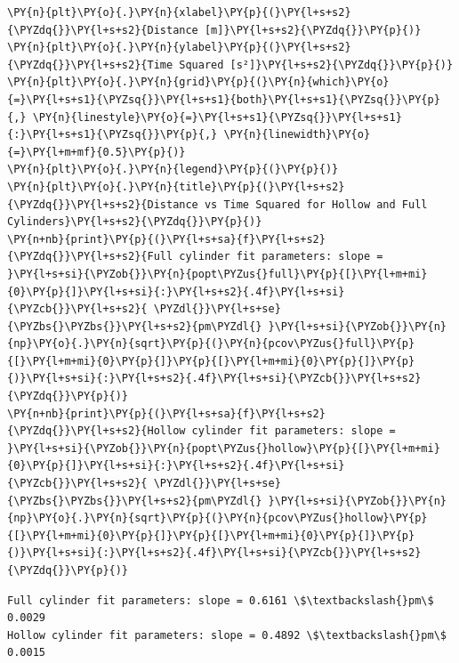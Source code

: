 \begin{tcolorbox}[breakable, size=fbox, boxrule=1pt, pad at break*=1mm,colback=cellbackground, colframe=cellborder]
\begin{Verbatim}[commandchars=\\\{\}]
\PY{n}{plt}\PY{o}{.}\PY{n}{xlabel}\PY{p}{(}\PY{l+s+s2}{\PYZdq{}}\PY{l+s+s2}{Distance [m]}\PY{l+s+s2}{\PYZdq{}}\PY{p}{)}
\PY{n}{plt}\PY{o}{.}\PY{n}{ylabel}\PY{p}{(}\PY{l+s+s2}{\PYZdq{}}\PY{l+s+s2}{Time Squared [s²]}\PY{l+s+s2}{\PYZdq{}}\PY{p}{)}
\PY{n}{plt}\PY{o}{.}\PY{n}{grid}\PY{p}{(}\PY{n}{which}\PY{o}{=}\PY{l+s+s1}{\PYZsq{}}\PY{l+s+s1}{both}\PY{l+s+s1}{\PYZsq{}}\PY{p}{,} \PY{n}{linestyle}\PY{o}{=}\PY{l+s+s1}{\PYZsq{}}\PY{l+s+s1}{:}\PY{l+s+s1}{\PYZsq{}}\PY{p}{,} \PY{n}{linewidth}\PY{o}{=}\PY{l+m+mf}{0.5}\PY{p}{)}
\PY{n}{plt}\PY{o}{.}\PY{n}{legend}\PY{p}{(}\PY{p}{)}
\PY{n}{plt}\PY{o}{.}\PY{n}{title}\PY{p}{(}\PY{l+s+s2}{\PYZdq{}}\PY{l+s+s2}{Distance vs Time Squared for Hollow and Full Cylinders}\PY{l+s+s2}{\PYZdq{}}\PY{p}{)}
\PY{n+nb}{print}\PY{p}{(}\PY{l+s+sa}{f}\PY{l+s+s2}{\PYZdq{}}\PY{l+s+s2}{Full cylinder fit parameters: slope = }\PY{l+s+si}{\PYZob{}}\PY{n}{popt\PYZus{}full}\PY{p}{[}\PY{l+m+mi}{0}\PY{p}{]}\PY{l+s+si}{:}\PY{l+s+s2}{.4f}\PY{l+s+si}{\PYZcb{}}\PY{l+s+s2}{ \PYZdl{}}\PY{l+s+se}{\PYZbs{}\PYZbs{}}\PY{l+s+s2}{pm\PYZdl{} }\PY{l+s+si}{\PYZob{}}\PY{n}{np}\PY{o}{.}\PY{n}{sqrt}\PY{p}{(}\PY{n}{pcov\PYZus{}full}\PY{p}{[}\PY{l+m+mi}{0}\PY{p}{]}\PY{p}{[}\PY{l+m+mi}{0}\PY{p}{]}\PY{p}{)}\PY{l+s+si}{:}\PY{l+s+s2}{.4f}\PY{l+s+si}{\PYZcb{}}\PY{l+s+s2}{\PYZdq{}}\PY{p}{)}
\PY{n+nb}{print}\PY{p}{(}\PY{l+s+sa}{f}\PY{l+s+s2}{\PYZdq{}}\PY{l+s+s2}{Hollow cylinder fit parameters: slope = }\PY{l+s+si}{\PYZob{}}\PY{n}{popt\PYZus{}hollow}\PY{p}{[}\PY{l+m+mi}{0}\PY{p}{]}\PY{l+s+si}{:}\PY{l+s+s2}{.4f}\PY{l+s+si}{\PYZcb{}}\PY{l+s+s2}{ \PYZdl{}}\PY{l+s+se}{\PYZbs{}\PYZbs{}}\PY{l+s+s2}{pm\PYZdl{} }\PY{l+s+si}{\PYZob{}}\PY{n}{np}\PY{o}{.}\PY{n}{sqrt}\PY{p}{(}\PY{n}{pcov\PYZus{}hollow}\PY{p}{[}\PY{l+m+mi}{0}\PY{p}{]}\PY{p}{[}\PY{l+m+mi}{0}\PY{p}{]}\PY{p}{)}\PY{l+s+si}{:}\PY{l+s+s2}{.4f}\PY{l+s+si}{\PYZcb{}}\PY{l+s+s2}{\PYZdq{}}\PY{p}{)}
\end{Verbatim}
\end{tcolorbox}

    \begin{Verbatim}[commandchars=\\\{\}]
Full cylinder fit parameters: slope = 0.6161 \$\textbackslash{}pm\$ 0.0029
Hollow cylinder fit parameters: slope = 0.4892 \$\textbackslash{}pm\$ 0.0015
    \end{Verbatim}

